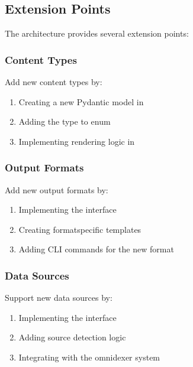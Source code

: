 \documentclass[letterpaper,10pt,english]{sphinxmanual}
\begin{document}
\subsection{Extension Points}
\label{\detokenize{developer/architecture:extension-points}}
\sphinxAtStartPar
The architecture provides several extension points:


\subsubsection{Content Types}
\label{\detokenize{developer/architecture:content-types}}
\sphinxAtStartPar
Add new content types by:
\begin{enumerate}
%
\item {} 
\sphinxAtStartPar
Creating a new Pydantic model in 

\item {} 
\sphinxAtStartPar
Adding the type to  enum

\item {} 
\sphinxAtStartPar
Implementing rendering logic in 

\end{enumerate}


\subsubsection{Output Formats}
\label{\detokenize{developer/architecture:output-formats}}
\sphinxAtStartPar
Add new output formats by:
\begin{enumerate}
%
\item {} 
\sphinxAtStartPar
Implementing the  interface

\item {} 
\sphinxAtStartPar
Creating format\sphinxhyphen{}specific templates

\item {} 
\sphinxAtStartPar
Adding CLI commands for the new format

\end{enumerate}


\subsubsection{Data Sources}
\label{\detokenize{developer/architecture:data-sources}}
\sphinxAtStartPar
Support new data sources by:
\begin{enumerate}
%
\item {} 
\sphinxAtStartPar
Implementing the  interface

\item {} 
\sphinxAtStartPar
Adding source detection logic

\item {} 
\sphinxAtStartPar
Integrating with the omnidexer system

\end{enumerate}
\end{document}
